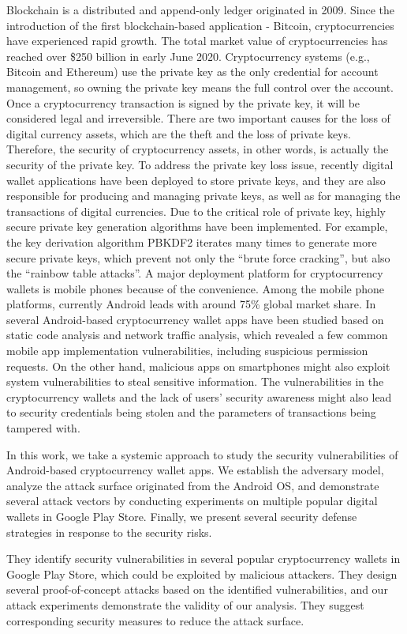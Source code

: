 \documentclass[12pt]{article}
\begin{document}
Blockchain is a distributed and append-only ledger originated in 2009. Since the introduction of the first
blockchain-based application - Bitcoin, cryptocurrencies have
experienced rapid growth. The total market value of cryptocurrencies has reached over \$250 billion in early June 2020.
Cryptocurrency systems (e.g., Bitcoin and Ethereum) use
the private key as the only credential for account management, so owning the private key means the full control over
the account. Once a cryptocurrency transaction is signed by
the private key, it will be considered legal and irreversible.
There are two important causes for the loss of digital currency
assets, which are the theft and the loss of private keys.
Therefore, the security of cryptocurrency assets, in other
words, is actually the security of the private key.
To address the private key loss issue, recently digital wallet
applications have been deployed to store private keys, and
they are also responsible for producing and managing private
keys, as well as for managing the transactions of digital
currencies. Due to the critical role of private key, highly
secure private key generation algorithms have been implemented. For example, the key derivation algorithm PBKDF2
iterates many times to generate more secure private keys,
which prevent not only the “brute force cracking”, but also
the “rainbow table attacks”.
A major deployment platform for cryptocurrency wallets
is mobile phones because of the convenience. Among the
mobile phone platforms, currently Android leads with around
75\% global market share. In several Android-based
cryptocurrency wallet apps have been studied based on static
code analysis and network traffic analysis, which revealed
a few common mobile app implementation vulnerabilities,
including suspicious permission requests. On the other hand,
malicious apps on smartphones might also exploit system
vulnerabilities to steal sensitive information. The vulnerabilities in the cryptocurrency wallets and the lack of users’
security awareness might also lead to security credentials being stolen and the parameters of transactions being tampered
with.
\par
In this work, we take a systemic approach to study the security vulnerabilities of Android-based cryptocurrency wallet
apps. We establish the adversary model, analyze the attack
surface originated from the Android OS, and demonstrate
several attack vectors by conducting experiments on multiple
popular digital wallets in Google Play Store. Finally, we
present several security defense strategies in response to the
security risks.
\par
 They identify security vulnerabilities in several popular
cryptocurrency wallets in Google Play Store, which
could be exploited by malicious attackers.
 They design several proof-of-concept attacks based on
the identified vulnerabilities, and our attack experiments
demonstrate the validity of our analysis.
 They suggest corresponding security measures to reduce
the attack surface.
\end{document}
